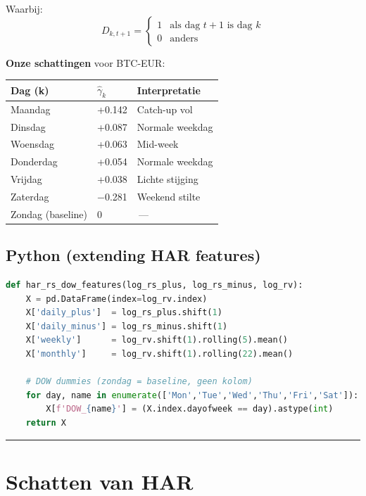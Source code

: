 Waarbij:
\[D_{k,t+1} = \begin{cases} 1 & \text{als dag } t+1 \text{ is dag } k \\ 0 & \text{anders} \end{cases}\]

\textbf{Onze schattingen} voor BTC-EUR:

\begin{longtable}[]{@{}lll@{}}
\toprule
Dag (k) & \(\hat\gamma_k\) & Interpretatie \\
\midrule
\endhead
Maandag & +0.142 & Catch-up vol \\
Dinsdag & +0.087 & Normale weekdag \\
Woensdag & +0.063 & Mid-week \\
Donderdag & +0.054 & Normale weekdag \\
Vrijdag & +0.038 & Lichte stijging \\
Zaterdag & −0.281 & Weekend stilte \\
Zondag (baseline) & 0 & \,---\, \\
\bottomrule
\end{longtable}

\hypertarget{python-extending-har-features}{%
\subsection{Python (extending HAR features)}\label{python-extending-har-features}}

\begin{lstlisting}[language=Python]
def har_rs_dow_features(log_rs_plus, log_rs_minus, log_rv):
    X = pd.DataFrame(index=log_rv.index)
    X['daily_plus']  = log_rs_plus.shift(1)
    X['daily_minus'] = log_rs_minus.shift(1)
    X['weekly']      = log_rv.shift(1).rolling(5).mean()
    X['monthly']     = log_rv.shift(1).rolling(22).mean()
    
    # DOW dummies (zondag = baseline, geen kolom)
    for day, name in enumerate(['Mon','Tue','Wed','Thu','Fri','Sat']):
        X[f'DOW_{name}'] = (X.index.dayofweek == day).astype(int)
    return X
\end{lstlisting}

\begin{center}\rule{0.5\linewidth}{0.5pt}\end{center}

\hypertarget{schatten-van-har}{%
\section{Schatten van HAR}\label{schatten-van-har}}

